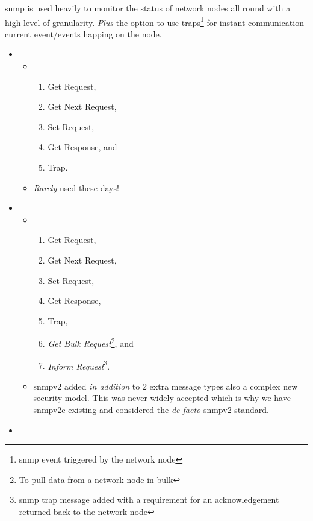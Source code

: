 \gls{snmp} is used heavily to monitor the status of network nodes all round with a high level of granularity. \textit{Plus} the option to use traps\footnote{\gls{snmp} event triggered by the network node} for instant communication  current event/events happing on the node.\cite{wiki:Simple_Network_Management_Protocol}


\begin{itemize}
	\item {}
	\begin{itemize}
		\item {}
		\begin{enumerate}
			\item Get Request,
			\item Get Next Request,
			\item Set Request,
			\item Get Response, and
			\item Trap.
		\end{enumerate}
		\item \textit{Rarely} used these days!
	\end{itemize}
	\newpage %
	\item {}
	\begin{itemize}
		\item {}
		\begin{enumerate}
			\item Get Request,
			\item Get Next Request,
			\item Set Request,
			\item Get Response,
			\item Trap,
			\item \textit{Get Bulk Request}\footnote{To pull data from a network node in bulk}, and
			\item \textit{Inform Request}\footnote{\gls{snmp} trap message added with a requirement for an acknowledgement returned back to the network node}.
		\end{enumerate}
		\item \gls{snmp}v2 added \textit{in addition} to 2 extra message types also a complex new security model. This was never widely accepted which is why we have \gls{snmp}v2c existing and considered the \textit{de-facto} \gls{snmp}v2 standard.
	\end{itemize}
	\item {}

\end{itemize}
